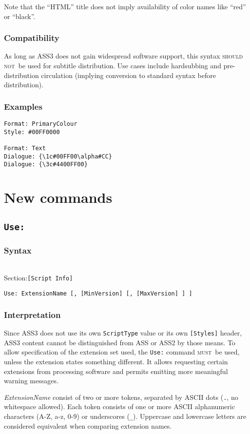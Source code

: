 \documentclass[11pt,a4paper]{article}
\newcommand{\shouldnot}{\textsc{should not}}
\newcommand{\must}{\textsc{must}}
\newcommand{\syntax}[1]{
	\subsubsection*{Syntax}
	\begin{tabbing}
	\hspace{2cm}\=\\[-16pt]
	#1
	\end{tabbing}
}
\newcommand{\secspec}[1]{Section:\>\texttt{#1}}
\begin{document}
Note that the ``HTML'' title does not imply availability of color names
like ``red'' or ``black''.

\subsubsection*{Compatibility}
As long as ASS3 does not gain widespread software support, this syntax
\shouldnot\ be used for subtitle distribution. Use cases include
hardsubbing and pre-distribution circulation (implying conversion to
standard syntax before distribution).

\subsubsection*{Examples}
\begin{verbatim}
Format: PrimaryColour
Style: #00FF0000

Format: Text
Dialogue: {\1c#00FF00\alpha#CC}
Dialogue: {\3c#4400FF00}
\end{verbatim}

\newpage
\section{New commands}
\subsection{\texttt{Use:}}
\syntax{\secspec{[Script Info]}}

\begin{verbatim}
Use: ExtensionName [, [MinVersion] [, [MaxVersion] ] ]
\end{verbatim}

\subsubsection*{Interpretation}
Since ASS3 does not use its own \texttt{ScriptType} value or its own
\texttt{[Styles]} header, ASS3 content cannot be distinguished from ASS or
ASS2 by those means. To allow specification of the extension set used,
the \texttt{Use:} command \must\ be used, unless the extension states
something different. It allows requesting certain
extensions from processing software and permits emitting more meaningful
warning messages.

\emph{ExtensionName} consist of two or more tokens, separated by ASCII dots
(\texttt{.}, no whitespace allowed). Each token consists of one or more ASCII
alphanumeric characters (A-Z, a-z, 0-9) or underscores (\texttt{\_}). Uppercase
and lowercase letters are considered equivalent when comparing extension names.
\end{document}
